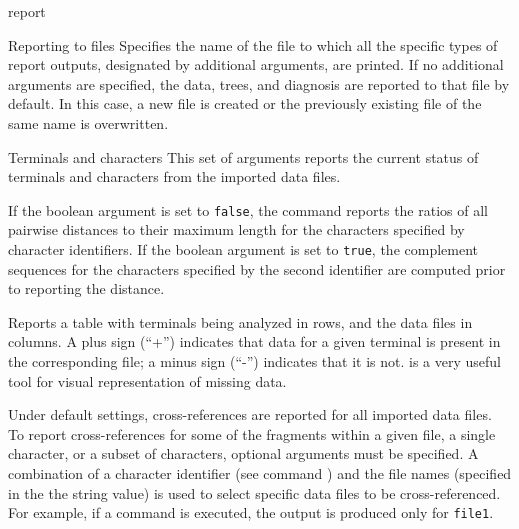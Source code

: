 \begin{command}{report}{}
\begin{arguments}
\begin{argumentgroup}{Reporting to files}{}
                {Specifies the name of the file to which all the specific types of report outputs,
                designated by additional arguments, are printed. If no additional arguments
                are specified, the data, trees, and diagnosis are reported to that file by
                default. In this case, a new file is created or the previously 
                existing file of the same name is overwritten.} 
                {}
                
        \end{argumentgroup}
                
	\begin{argumentgroup}{Terminals and characters}
            {This set of arguments reports the current status of terminals and
            characters from the imported data files. }
		
                {If the boolean argument is set to \texttt{false}, the command
                reports the ratios of all pairwise distances to their maximum length
                for the characters specified by character identifiers. If the boolean
                argument is set to \texttt{true}, the complement sequences for
                the characters specified by the second identifier are computed prior
                to reporting the distance.}{}

                {Reports a table with terminals being analyzed in rows, and the
                data files in columns. A plus sign (``+'') indicates that data for a given
                terminal is
                present in the corresponding file; a minus sign (``-'') indicates that it is
                not.  is a very useful tool for visual
                representation of missing data.
                
                Under default settings, cross-references are reported for
                all imported data files. To report cross-references for some of
                the fragments within a given file, a single character, or a subset
                of characters, optional arguments must be specified. A combination of
                a character identifier (see command  ) and
                the file names (specified in the the string value) is used to select specific
                data files to be cross-referenced. For example, if a
                command  is
                executed, the output is produced only for \texttt{file1}.
                
}
\end{argumentgroup}
\end{arguments}
\end{command}
